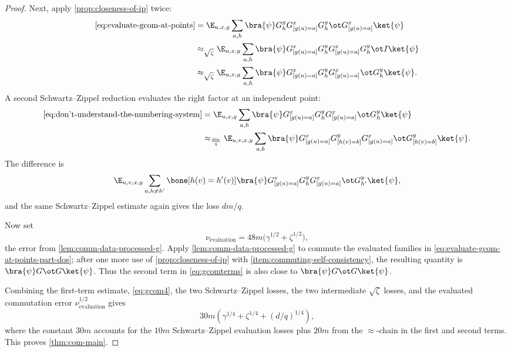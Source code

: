 \begin{proof}
	Next, apply \ref{prop:closeness-of-ip} twice:
	\begin{align}
		\eqref{eq:evaluate-gcom-at-points}
		 & = \E_{u,x,y} \sum_{a,h}
		\bra{\psi} G_h^y G^x_{[g(u)=a]} G_h^y \ot G^x_{[g(u)=a]} \ket{\psi}\nonumber   \\
		 & \approx_{\sqrt{\zeta}}
		\E_{u,x,y} \sum_{a,h}
		\bra{\psi} G^x_{[g(u)=a]} G_h^y G^x_{[g(u)=a]} G_h^y \ot I \ket{\psi}\nonumber \\
		 & \approx_{\sqrt{\zeta}}
		\E_{u,x,y} \sum_{a,h}
		\bra{\psi} G^x_{[g(u)=a]} G_h^y G^x_{[g(u)=a]} \ot G_h^y \ket{\psi}.
		\label{eq:don't-understand-the-numbering-system}
	\end{align}
	A second Schwartz--Zippel reduction evaluates the right factor at an independent point:
	\begin{align}
		\eqref{eq:don't-understand-the-numbering-system}
		 & = \E_{u,x,y} \sum_{a,h}
		\bra{\psi} G^x_{[g(u)=a]} G_h^y G^x_{[g(u)=a]} \ot G_h^y \ket{\psi}\nonumber \\
		 & \approx_{\frac{dm}{q}}
		\E_{u,v,x,y} \sum_{a,b}
		\bra{\psi}
		G^x_{[g(u)=a]} G^y_{[h(v)=b]} G^x_{[g(u)=a]}
		\ot G^y_{[h(v)=b]} \ket{\psi}.
		\label{eq:evaluate-gcom-at-points-part-dos}
	\end{align}
	The difference is
	\begin{equation}
		\label{eq:numbering-system-diff}
		\E_{u,v,x,y} \sum_{a,h \neq h'}
		\bone[h(v)=h'(v)]
		\bra{\psi}
		G^x_{[g(u)=a]} G_h^y G^x_{[g(u)=a]} \ot G_{h'}^y \ket{\psi},
	\end{equation}
	and the same Schwartz--Zippel estimate again gives the loss $dm/q$.

	Now set
	\[
		\nu_{\mathrm{evaluation}} = 48m\bigl(\gamma^{1/2}+\zeta^{1/2}\bigr),
	\]
	the error from \ref{lem:comm-data-processed-g}. Apply \ref{lem:comm-data-processed-g} to commute the evaluated families in \ref{eq:evaluate-gcom-at-points-part-dos}; after one more use of \ref{prop:closeness-of-ip} with \ref{item:commuting-self-consistency}, the resulting quantity is $\bra{\psi} G \ot G \ket{\psi}$. Thus the second term in \ref{eq:gcomterms} is also close to $\bra{\psi} G \ot G \ket{\psi}$.

	Combining the first-term estimate, \ref{eq:gcom4}, the two Schwartz--Zippel losses, the two intermediate $\sqrt{\zeta}$ losses, and the evaluated commutation error $\nu_{\mathrm{evaluation}}^{1/2}$ gives
	\[
		30m\left(\gamma^{1/4}+\zeta^{1/4}+(d/q)^{1/4}\right),
	\]
	where the constant $30m$ accounts for the $10m$ Schwartz--Zippel evaluation losses plus $20m$ from the $\approx$-chain in the first and second terms. This proves \ref{thm:com-main}.
\end{proof}



